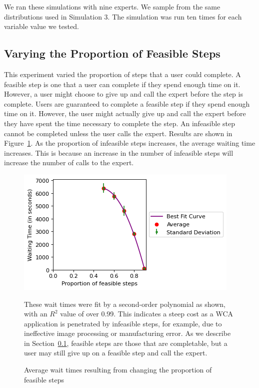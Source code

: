 We ran these simulations with nine experts.
We sample from the same distributions used in Simulation 3.
The simulation was run ten times for each variable value we tested.

\subsection{Varying the Proportion of Feasible Steps}\label{sec:feasible}

This experiment varied the proportion of steps that a user could complete.
A feasible step is one that a user can complete if they spend enough time on it.
However, a user might choose to give up and call the expert before the step is
complete.
Users are guaranteed to complete a feasible step if they spend enough time on
it.
However, the user might actually give up and call the expert before they have
spent the time necessary to complete the step.
An infeasible step cannot be completed unless the user calls the expert.
Results are shown in Figure~\ref{fig:vary_success}.
As the proportion of infeasible steps increases, the average waiting time
increases.
This is because an increase in the number of infeasible steps will increase the
number of calls to the expert.

\begin{figure}[h]
  \includegraphics{figures/montecarlo/vary_success.png}
  \begin{captiontext}
    These wait times were fit by a second-order polynomial as shown, with an
    $R^2$ value of over 0.99.
    This indicates a steep cost as a WCA application is penetrated by infeasible
    steps, for example, due to ineffective image processing or manufacturing
    error.
    As we describe in Section~\ref{sec:feasible}, feasible steps are those that
    are completable, but a user may still give up on a feasible step and call
    the expert.
  \end{captiontext}
  \caption{
    Average wait times resulting from changing the proportion of feasible steps
  }\label{fig:vary_success}
\end{figure}

